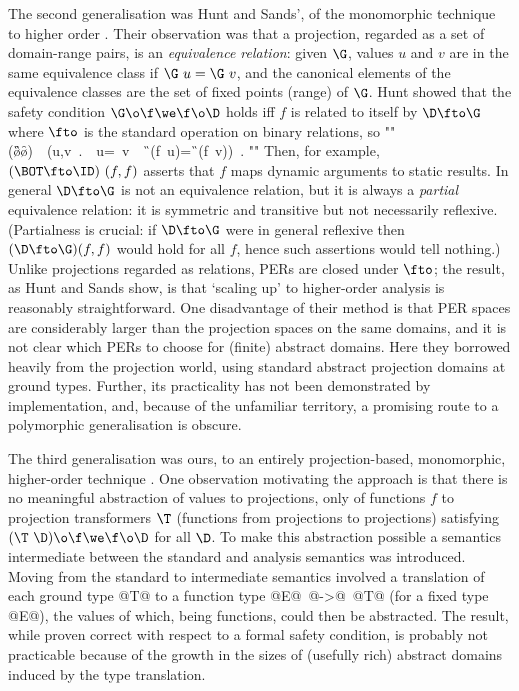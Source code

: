 \documentclass[11pt]{article}
\begin{document}
The second generalisation was Hunt and Sands', of the monomorphic
technique to higher order \cite{HS91}.  Their observation was that a
projection, regarded as a set of domain-range pairs, is an {\it
equivalence relation\/}: given $\G$, values $u$ and $v$ are in the
same equivalence class if $\G~u=\G~v$, and the canonical elements of
the equivalence classes are the set of fixed points (range) of $\G$.
Hunt showed that the safety condition $\G\o\f\we\f\o\D$ holds iff $f$
is related to itself by $\D\fto\G$ where $\fto$ is the standard
operation on binary relations, so 
"" 
	(\G\o\f\we\f\o\D)\
	\Leftrightarrow\ 
	(\forall u,v\ .\ \D\ u=\D\ v\ \Rightarrow\ \G\ (f\ u)=\G\ (f\ v))\ .  
""
Then, for example, $(\BOT\fto\ID)~(f,f)$ asserts
that $f$ maps dynamic arguments to static results.  In general
$\D\fto\G$ is not an equivalence relation, but it is always a {\it
partial\/} equivalence relation: it is symmetric and transitive but
not necessarily reflexive.  (Partialness is crucial: if $\D\fto\G$
were in general reflexive then $(\D\fto\G)(f,f)$ would hold for all
$f$, hence such assertions would tell nothing.)  Unlike projections
regarded as relations, PERs are closed under $\fto$; the result, as
Hunt and Sands show, is that `scaling up' to higher-order analysis is
reasonably straightforward.  One disadvantage of their method is that
PER spaces are considerably larger than the projection spaces on the
same domains, and it is not clear which PERs to choose for (finite)
abstract domains.  Here they borrowed heavily from the projection
world, using standard abstract projection domains at ground types.
Further, its practicality has not been demonstrated by implementation,
and, because of the unfamiliar territory, a promising route to a
polymorphic generalisation is obscure.

The third generalisation was ours, to an entirely projection-based,
monomorphic, higher-order technique \cite{Dav93b}.  One observation
motivating the approach is that there is no meaningful abstraction of
values to projections, only of functions $f$ to projection
transformers $\T$ (functions from projections to projections)
satisfying $(\T~\D)\o\f\we\f\o\D$ for all $\D$.  To make this
abstraction possible a semantics intermediate between the standard and
analysis semantics was introduced.  Moving from the standard to
intermediate semantics involved a translation of each ground type @T@
to a function type @E@\ @->@\ @T@ (for a fixed type @E@), the values
of which, being functions, could then be abstracted.  The result,
while proven correct with respect to a formal safety condition, is
probably not practicable because of the growth in the sizes of
(usefully rich) abstract domains induced by the type translation.
\end{document}

